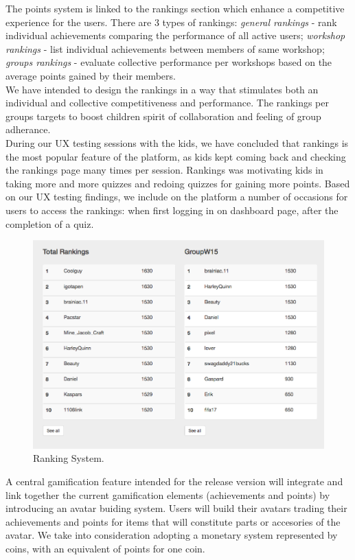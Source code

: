 The points system is linked to the rankings section which enhance a competitive experience for the users. 
There are 3 types of rankings: \textit{general rankings} - rank individual achievements comparing the performance of all active users; \textit{workshop rankings} - list individual achievements between members of same workshop; \textit{groups rankings} - evaluate collective performance per workshops based on the average points gained by their members. \\

We have intended to design the rankings in a way that stimulates both an individual and collective competitiveness and performance. The rankings per groups targets to boost children spirit of collaboration and feeling of group adherance. \\

During our UX testing sessions with the kids, we have concluded that rankings is the most popular feature of the platform, as kids kept coming back and checking the rankings page many times per session. Rankings was motivating kids in taking more and more quizzes and redoing quizzes for gaining more points.
Based on our UX testing findings, we include on the platform a number of occasions for users to access the rankings: when first logging in on dashboard page, after the completion of a quiz.
\\

\begin{figure}
\includegraphics[width=1\linewidth]{images/ui/Rankings.png}
\caption{Ranking System.}
\label{fig:Rankings}
\end{figure}

A central gamification feature intended for the release version will integrate and link together the current gamification elements (achievements and points) by introducing an avatar buiding system. Users will build their avatars trading their achievements and points for items that will constitute parts or accesories of the avatar. We take into consideration adopting a monetary system represented by coins, with an equivalent of points for one coin.

